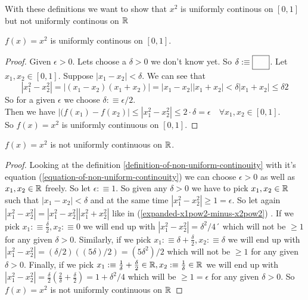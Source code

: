 With these definitions we want to show that $x^{2}$ is uniformly continous on $[0
,1]$ but not uniformly continous on $\mathbb{R}$

\begin{thm}
  $f(x)=x^{2}$ is uniformly continous on $[0,1]$.
\end{thm}
\begin{proof}
  Given $\epsilon > 0$. Lets choose a $\delta>0$ we don't know yet. So $\delta :\equiv
  \boxed{\color{white}\epsilon/2}$. Let $x_{1}, x_{2} \in [0,1]$. Suppose $|x_{1}
  -x_{2}| < \delta$. We can see that
  \begin{equation}
    \label{expanded-x1pow2-minus-x2pow2}|x_{1}^{2} - x_{2}^{2}| = |(x_{1} - x_{2}
    )(x_{1}+x_{2})| = |x_{1} - x_{2}||x_{1}+x_{2}| < \delta |x_{1}+x_{2}| \leq \delta
    2
  \end{equation}
  So for a given $\epsilon$ we choose $\delta :\equiv \boxed{\epsilon/2}$. \\ Then
  we have $|(f(x_{1})-f(x_{2})| \leq |x_{1}^{2} - x_{2}^{2}| \leq 2\cdot \delta =
  \epsilon \quad \forall x_{1}, x_{2} \in [0,1]$.\\ So $f(x)=x^{2}$ is uniformly
  continuous on $[0,1]$.
\end{proof}

\begin{thm}
  $f(x)=x^{2}$ is not uniformly continuous on $\mathbb{R}$.
\end{thm}
\begin{proof}
  Looking at the definition \ref{definition-of-non-uniform-continouity} with it's
  equation (\ref{equation-of-non-uniform-continouity}) we can choose $\epsilon>0$
  as well as $x_{1}, x_{2} \in \mathbb{R}$ freely. So let $\epsilon : \equiv 1$. So given
  any $\delta > 0$ we have to pick $x_{1}, x_{2} \in \mathbb{R}$ such that $|x_{1}-x_{2}
  |<\delta$ and at the same time $|x_{1}^{2}-x_{2}^{2}|\geq1=\epsilon$. So let
  again $|x_{1}^{2}-x_{2}^{2}|=|x_{1}^{2}-x_{2}^{2}||x_{1}^{2}+x_{2}^{2}|$ like
  in (\ref*{expanded-x1pow2-minus-x2pow2}) . If we pick
  $x_{1} :\equiv\frac{\delta}{2}, x_{2} :\equiv 0$ we will end up with
  $|x_{1}^{2}-x_{2}^{2}|= \delta^{2}/4´$ which will not be $\geq 1$ for any
  given $\delta>0$. Similarly, if we pick
  $x_{1} : \equiv \delta + \frac{\delta}{2}, x_{2} :\equiv \delta$ we will end
  up with $|x_{1}^{2}-x_{2}^{2}|= (\delta/2)((5\delta)/2)=(5\delta^{2})/2$ which
  will not be $\geq 1$ for any given $\delta>0$. Finally, if we pick
  $x_{1} : \equiv \frac{1}{\delta}+ \frac{\delta}{2}\in \mathbb{R}, x_{2} :\equiv \frac{1}{\delta}
  \in \mathbb{R}$
  we will end up with
  $|x_{1}^{2}-x_{2}^{2}|= \frac{\delta}{2}(\frac{2}{\delta}+\frac{\delta}{2})=1+\delta
  ^{2}/4$
  which will be $\geq 1=\epsilon$ for any given $\delta>0$. So $f(x)=x^{2}$ is not
  uniformly continuous on $\mathbb{R}$
\end{proof}

